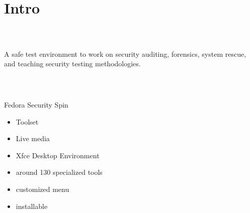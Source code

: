 \section{Intro}
%
\begin{frame}
\frametitle{\\}
A safe test environment to work on security auditing, forensics, system rescue, and teaching security testing methodologies.
\end{frame}
%
\begin{frame}
\frametitle{\\}
%
{\LARGE Fedora Security Spin \newline}
\begin{itemize}
  \item Toolset
  \item Live media
  \item Xfce Desktop Environment
  \item around 130 specialized tools
  \item customized menu
  \item installable
\end{itemize}
\end{frame}
